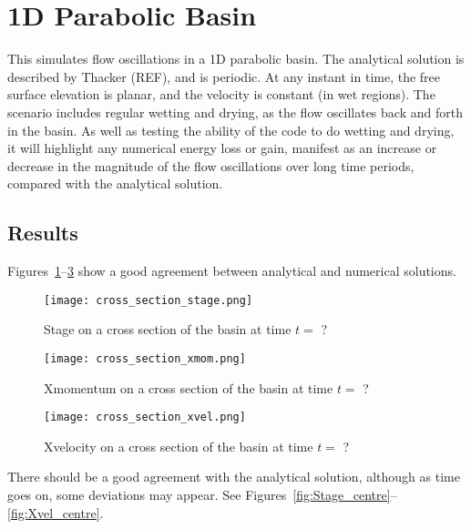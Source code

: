 \section{1D Parabolic Basin}
This simulates flow oscillations in a 1D parabolic basin. The analytical solution is described by Thacker (REF), and is periodic. At any instant in time, the free surface elevation is planar, and the velocity is constant (in wet regions). The scenario includes regular wetting and drying, as the flow oscillates back and forth in the basin. As well as testing the ability of the code to do wetting and drying, it will highlight any numerical energy loss or gain, manifest as an increase or decrease in the magnitude of the flow oscillations over long time periods, compared with the analytical solution. 

\subsection{Results}

Figures~\ref{fig:cross_section_stage}--\ref{fig:cross_section_xvel} show a good agreement between analytical and numerical solutions.

\begin{figure}[h]
\begin{center}
\texttt{[image: cross\_section\_stage.png]}
\caption{Stage on a cross section of the basin at time $t=$ ?}
\label{fig:cross_section_stage}
\end{center}
\end{figure}

\begin{figure}[h]
\begin{center}
\texttt{[image: cross\_section\_xmom.png]}
\caption{Xmomentum on a cross section of the basin at time $t=$ ?}
\label{fig:cross_section_xmom}
\end{center}
\end{figure}

\begin{figure}[h]
\begin{center}
\texttt{[image: cross\_section\_xvel.png]}
\caption{Xvelocity on a cross section of the basin at time $t=$ ?}
\label{fig:cross_section_xvel}
\end{center}
\end{figure}


There should be a good agreement with the analytical solution, although as time goes on, some deviations may appear.  See Figures~\ref{fig:Stage_centre}--\ref{fig:Xvel_centre}.

